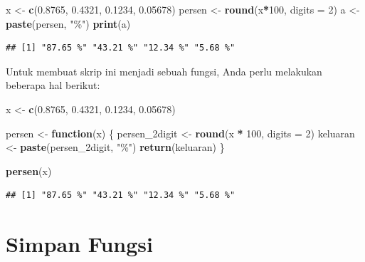 \documentclass[
]{book}
\newenvironment{Shaded}{\begin{snugshade}}{\end{snugshade}}
\newcommand{\AttributeTok}[1]{\textcolor[rgb]{0.13,0.29,0.53}{#1}}
\newcommand{\ControlFlowTok}[1]{\textcolor[rgb]{0.13,0.29,0.53}{\textbf{#1}}}
\newcommand{\DecValTok}[1]{\textcolor[rgb]{0.00,0.00,0.81}{#1}}
\newcommand{\FloatTok}[1]{\textcolor[rgb]{0.00,0.00,0.81}{#1}}
\newcommand{\FunctionTok}[1]{\textcolor[rgb]{0.13,0.29,0.53}{\textbf{#1}}}
\newcommand{\NormalTok}[1]{#1}
\newcommand{\OtherTok}[1]{\textcolor[rgb]{0.56,0.35,0.01}{#1}}
\newcommand{\SpecialCharTok}[1]{\textcolor[rgb]{0.81,0.36,0.00}{\textbf{#1}}}
\newcommand{\StringTok}[1]{\textcolor[rgb]{0.31,0.60,0.02}{#1}}
\begin{document}
\begin{Shaded}
\begin{Highlighting}[]
\NormalTok{x }\OtherTok{\textless{}{-}} \FunctionTok{c}\NormalTok{(}\FloatTok{0.8765}\NormalTok{, }\FloatTok{0.4321}\NormalTok{, }\FloatTok{0.1234}\NormalTok{, }\FloatTok{0.05678}\NormalTok{)}
\NormalTok{persen }\OtherTok{\textless{}{-}} \FunctionTok{round}\NormalTok{(x}\SpecialCharTok{*}\DecValTok{100}\NormalTok{, }\AttributeTok{digits =} \DecValTok{2}\NormalTok{)}
\NormalTok{a }\OtherTok{\textless{}{-}} \FunctionTok{paste}\NormalTok{(persen, }\StringTok{"\%"}\NormalTok{)}
\FunctionTok{print}\NormalTok{(a)}
\end{Highlighting}
\end{Shaded}

\begin{verbatim}
## [1] "87.65 %" "43.21 %" "12.34 %" "5.68 %"
\end{verbatim}

Untuk membuat skrip ini menjadi sebuah fungsi, Anda perlu melakukan beberapa hal berikut:

\begin{Shaded}
\begin{Highlighting}[]
\NormalTok{x }\OtherTok{\textless{}{-}} \FunctionTok{c}\NormalTok{(}\FloatTok{0.8765}\NormalTok{, }\FloatTok{0.4321}\NormalTok{, }\FloatTok{0.1234}\NormalTok{, }\FloatTok{0.05678}\NormalTok{)}

\NormalTok{persen }\OtherTok{\textless{}{-}} \ControlFlowTok{function}\NormalTok{(x)}
\NormalTok{  \{}
\NormalTok{    persen\_2digit }\OtherTok{\textless{}{-}} \FunctionTok{round}\NormalTok{(x }\SpecialCharTok{*} \DecValTok{100}\NormalTok{, }\AttributeTok{digits =} \DecValTok{2}\NormalTok{)}
\NormalTok{    keluaran }\OtherTok{\textless{}{-}} \FunctionTok{paste}\NormalTok{(persen\_2digit, }\StringTok{"\%"}\NormalTok{)}
     \FunctionTok{return}\NormalTok{(keluaran)}
\NormalTok{\}}

\FunctionTok{persen}\NormalTok{(x)}
\end{Highlighting}
\end{Shaded}

\begin{verbatim}
## [1] "87.65 %" "43.21 %" "12.34 %" "5.68 %"
\end{verbatim}

\hypertarget{simpan-fungsi}{%
\section{Simpan Fungsi}\label{simpan-fungsi}}
\end{document}
